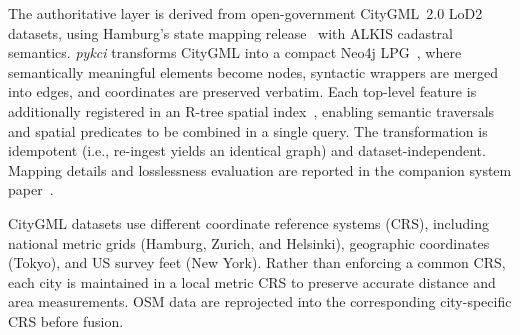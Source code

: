 \documentclass[sigconf,authordraft]{acmart}
\newcommand{\mytoolname}{\textit{pykci}}
\begin{document}
The authoritative layer is derived from open-government CityGML~2.0 LoD2 datasets, using Hamburg's state mapping release~\cite{lgv_hhcitygml_2025} with ALKIS cadastral semantics. \mytoolname{} transforms CityGML into a compact Neo4j LPG~\cite{robinson_graphdb_2015}, where semantically meaningful elements become nodes, syntactic wrappers are merged into edges, and coordinates are preserved verbatim. Each top-level feature is additionally registered in an R-tree spatial index~\cite{neo4j_spatial_2025}, enabling semantic traversals and spatial predicates to be combined in a single query. 
The transformation is idempotent (i.e., re-ingest yields an identical graph) and dataset-independent. Mapping details and losslessness evaluation are reported in the companion system paper~\cite{nguyen_pykci_2026}.


CityGML datasets use different coordinate reference systems (CRS), including national metric grids (Hamburg, Zurich, and Helsinki), geographic coordinates (Tokyo), and US survey feet (New York). Rather than enforcing a common CRS, each city is maintained in a local metric CRS to preserve accurate distance and area measurements. 
OSM data are reprojected into the corresponding city-specific CRS before fusion.
\end{document}

